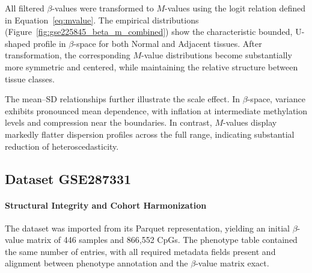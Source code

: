 All filtered $\beta$-values were transformed to $M$-values using the logit relation defined in Equation~\eqref{eq:mvalue}. 
The empirical distributions (Figure~\ref{fig:gse225845_beta_m_combined}) show the characteristic bounded, U-shaped profile in $\beta$-space for both Normal and Adjacent tissues. After transformation, the corresponding $M$-value distributions become substantially more symmetric and centered, while maintaining the relative structure between tissue classes.

The mean--SD relationships further illustrate the scale effect. In $\beta$-space, variance exhibits pronounced mean dependence, with inflation at intermediate methylation levels and compression near the boundaries. In contrast, $M$-values display markedly flatter dispersion profiles across the full range, indicating substantial reduction of heteroscedasticity. 



\subsection{Dataset GSE287331}
\label{subsec:gse287331_data_prep}



\paragraph{Structural Integrity and Cohort Harmonization}
\label{par:gse287331_missingness}

The dataset was imported from its Parquet representation, yielding an initial
$\beta$-value matrix of 446 samples and 866{,}552 CpGs. The phenotype table
contained the same number of entries, with all required metadata fields present
and alignment between phenotype annotation and the $\beta$-value matrix exact.

